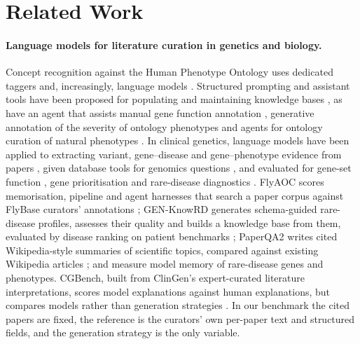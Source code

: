 \documentclass{article} %
\begin{document}
\section{Related Work}
\label{sec:related_work}
\paragraph{Language models for literature curation in genetics and biology.}
Concept recognition against the Human Phenotype Ontology uses dedicated taggers \citep{luo2021phenotagger,groza2024fasthpocr} and, increasingly, language models \citep{groza2024evaluation,yang2024enhancing,garcia2025improving}. Structured prompting and assistant tools have been proposed for populating and maintaining knowledge bases \citep{caufield2024structured,caufield2024curategpt,toro2024dynamic,niyonkuru2025leveraging}, as have an agent that assists manual gene function annotation \citep{Li2025GenewhispererEnhancing}, generative annotation of the severity of ontology phenotypes \citep{Murphy2024HarnessingGenerative} and agents for ontology curation of natural phenotypes \citep{balhoff2026frontier}. In clinical genetics, language models have been applied to extracting variant, gene--disease and gene--phenotype evidence from papers \citep{li2025autopm3,furlan2025eagleai,wang2026pubmind,yin2026benchmarking}, given database tools for genomics questions \citep{Jin2023GenegptAugmenting}, and evaluated for gene-set function \citep{hu2025evaluation}, gene prioritisation \citep{Kim2024AssessingUtility} and rare-disease diagnostics \citep{twede2026evidence}. FlyAOC scores memorisation, pipeline and agent harnesses that search a paper corpus against FlyBase curators' annotations \citep{zhang2026flyaoc}; GEN-KnowRD generates schema-guided rare-disease profiles, assesses their quality and builds a knowledge base from them, evaluated by disease ranking on patient benchmarks \citep{yan2026genknowrd}; PaperQA2 writes cited Wikipedia-style summaries of scientific topics, compared against existing Wikipedia articles \citep{skarlinski2024language}; and \citet{groza2026systematic} measure model memory of rare-disease genes and phenotypes. CGBench, built from ClinGen's expert-curated literature interpretations, scores model explanations against human explanations, but compares models rather than generation strategies \citep{queen2025cgbench}. In our benchmark the cited papers are fixed, the reference is the curators' own per-paper text and structured fields, and the generation strategy is the only variable.
\end{document}
